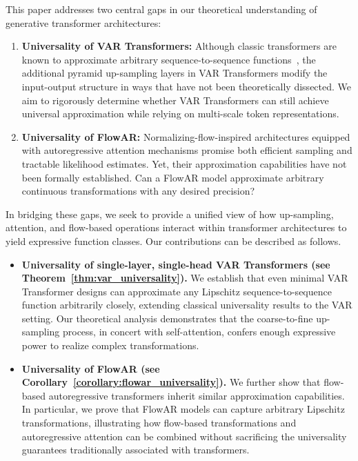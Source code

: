 This paper addresses two central gaps in our theoretical understanding of generative transformer architectures:
\begin{enumerate}
    \item {\bf Universality of VAR Transformers:} Although classic transformers are known to approximate arbitrary sequence-to-sequence functions~\cite{ks24,kkm22,ybr+20,hwg+24}, the additional pyramid up-sampling layers in VAR Transformers modify the input-output structure in ways that have not been theoretically dissected. We aim to rigorously determine whether VAR Transformers can still achieve universal approximation while relying on multi-scale token representations.
    \item {\bf Universality of FlowAR:} Normalizing-flow-inspired architectures equipped with autoregressive attention mechanisms promise both efficient sampling and tractable likelihood estimates. Yet, their approximation capabilities have not been formally established. Can a FlowAR model approximate arbitrary continuous transformations with any desired precision?
\end{enumerate}

In bridging these gaps, we seek to provide a unified view of how up-sampling, attention, and flow-based operations interact within transformer architectures to yield expressive function classes. Our contributions can be described as follows.
\begin{itemize}
    \item {\bf Universality of single-layer, single-head VAR Transformers (see Theorem~\ref{thm:var_universality}).} We establish that even minimal VAR Transformer designs can approximate any Lipschitz sequence-to-sequence function arbitrarily closely, extending classical universality results to the VAR setting. Our theoretical analysis demonstrates that the coarse-to-fine up-sampling process, in concert with self-attention, confers enough expressive power to realize complex transformations.
    
    \item {\bf Universality of FlowAR (see Corollary~\ref{corollary:flowar_universality}).} We further show that flow-based autoregressive transformers inherit similar approximation capabilities. In particular, we prove that FlowAR models can capture arbitrary Lipschitz transformations, illustrating how flow-based transformations and autoregressive attention can be combined without sacrificing the universality guarantees traditionally associated with transformers.
\end{itemize}

